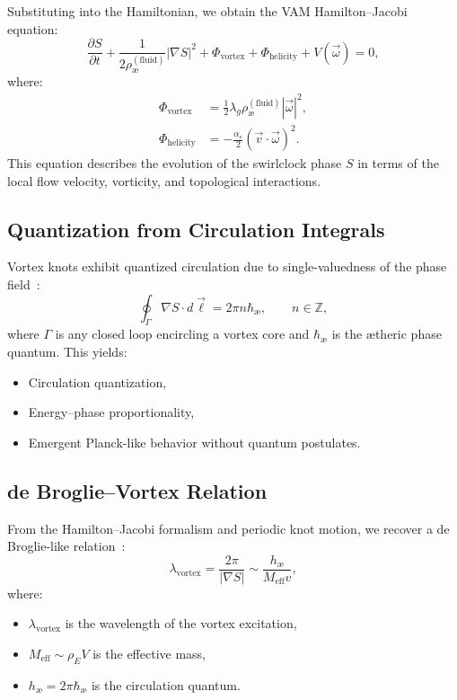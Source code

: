 \documentclass[preprint]{revtex4-2}
\begin{document}
Substituting into the Hamiltonian, we obtain the VAM Hamilton–Jacobi equation:
\begin{equation}
\frac{\partial S}{\partial t} + \frac{1}{2 \rho_\text{\ae}^{(\text{fluid})}} |\nabla S|^2
+ \Phi_\text{vortex} + \Phi_\text{helicity} + V(\vec{\omega}) = 0,
\end{equation}
where:
\begin{align*}
\Phi_\text{vortex} &= \frac{1}{2} \lambda_g \rho_\text{\ae}^{(\text{fluid})} |\vec{\omega}|^2, \\
\Phi_\text{helicity} &= -\frac{\alpha_e}{2} (\vec{v} \cdot \vec{\omega})^2.
\end{align*}
This equation describes the evolution of the swirlclock phase \( S \) in terms of the local flow velocity, vorticity, and topological interactions.


\subsection*{Quantization from Circulation Integrals}

Vortex knots exhibit quantized circulation due to single-valuedness of the phase field~\cite{Helmholtz1858, faddeev1997stable}:
\begin{equation}
\oint_\Gamma \nabla S \cdot d\vec{\ell} = 2\pi n \hbar_\text{\ae}, \qquad n \in \mathbb{Z},
\end{equation}
where \( \Gamma \) is any closed loop encircling a vortex core and \( \hbar_\text{\ae} \) is the ætheric phase quantum. This yields:
\begin{itemize}
    \item Circulation quantization,
    \item Energy–phase proportionality,
    \item Emergent Planck-like behavior without quantum postulates.
\end{itemize}

\subsection*{de Broglie--Vortex Relation}

From the Hamilton–Jacobi formalism and periodic knot motion, we recover a de Broglie-like relation~\cite{ranada1990topological}:
\begin{equation}
\lambda_\text{vortex} = \frac{2\pi}{|\nabla S|} \sim \frac{h_\text{\ae}}{M_\text{eff} v},
\end{equation}
where:
\begin{itemize}
    \item \( \lambda_\text{vortex} \) is the wavelength of the vortex excitation,
    \item \( M_\text{eff} \sim \rho_{\scriptscriptstyle\boldsymbol\!E}V \) is the effective mass,
    \item \( h_\text{\ae} = 2\pi \hbar_\text{\ae} \) is the circulation quantum.
\end{itemize}
\end{document}
